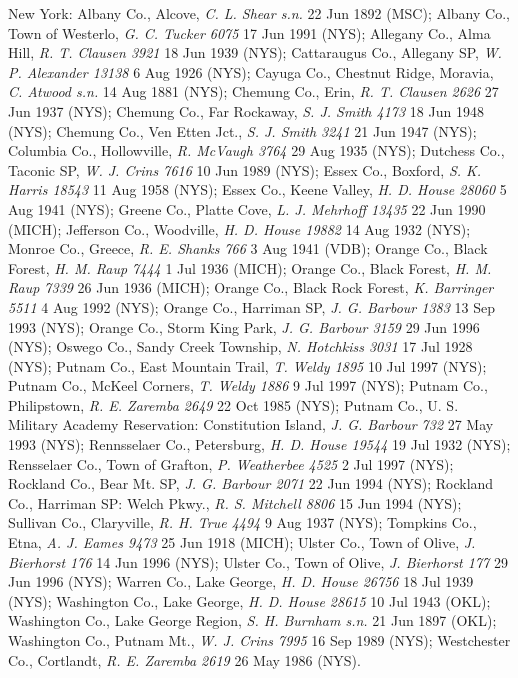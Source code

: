 \documentclass{article}
\begin{document}
New York:
Albany Co., Alcove, \textit{C. L. Shear s.n.} 22 Jun 1892 (MSC);
Albany Co., Town of Westerlo, \textit{G. C. Tucker 6075} 17 Jun 1991 (NYS);
Allegany Co., Alma Hill, \textit{R. T. Clausen 3921} 18 Jun 1939 (NYS);
Cattaraugus Co., Allegany SP, \textit{W. P. Alexander 13138} 6 Aug 1926 (NYS);
Cayuga Co., Chestnut Ridge, Moravia, \textit{C. Atwood s.n.} 14 Aug 1881 (NYS);
Chemung Co., Erin, \textit{R. T. Clausen 2626} 27 Jun 1937 (NYS);
Chemung Co., Far Rockaway, \textit{S. J. Smith 4173} 18 Jun 1948 (NYS);
Chemung Co., Ven Etten Jct., \textit{S. J. Smith 3241} 21 Jun 1947 (NYS);
Columbia Co., Hollowville, \textit{R. McVaugh 3764} 29 Aug 1935 (NYS);
Dutchess Co., Taconic SP, \textit{W. J. Crins 7616} 10 Jun 1989 (NYS);
Essex Co., Boxford, \textit{S. K. Harris 18543} 11 Aug 1958 (NYS);
Essex Co., Keene Valley, \textit{H. D. House 28060} 5 Aug 1941 (NYS);
Greene Co., Platte Cove, \textit{L. J. Mehrhoff 13435} 22 Jun 1990 (MICH);
Jefferson Co., Woodville, \textit{H. D. House 19882} 14 Aug 1932 (NYS);
Monroe Co., Greece, \textit{R. E. Shanks 766} 3 Aug 1941 (VDB);
Orange Co., Black Forest, \textit{H. M. Raup 7444} 1 Jul 1936 (MICH);
Orange Co., Black Forest, \textit{H. M. Raup 7339} 26 Jun 1936 (MICH);
Orange Co., Black Rock Forest, \textit{K. Barringer 5511} 4 Aug 1992 (NYS);
Orange Co., Harriman SP, \textit{J. G. Barbour 1383} 13 Sep 1993 (NYS);
Orange Co., Storm King Park, \textit{J. G. Barbour 3159} 29 Jun 1996 (NYS);
Oswego Co., Sandy Creek Township, \textit{N. Hotchkiss 3031} 17 Jul 1928 (NYS);
Putnam Co., East Mountain Trail, \textit{T. Weldy 1895} 10 Jul 1997 (NYS);
Putnam Co., McKeel Corners, \textit{T. Weldy 1886} 9 Jul 1997 (NYS);
Putnam Co., Philipstown, \textit{R. E. Zaremba 2649} 22 Oct 1985 (NYS);
Putnam Co., U. S. Military Academy Reservation: Constitution Island, \textit{J. G. Barbour 732} 27 May 1993 (NYS);
Rennsselaer Co., Petersburg, \textit{H. D. House 19544} 19 Jul 1932 (NYS);
Rensselaer Co., Town of Grafton, \textit{P. Weatherbee 4525} 2 Jul 1997 (NYS);
Rockland Co., Bear Mt. SP, \textit{J. G. Barbour 2071} 22 Jun 1994 (NYS);
Rockland Co., Harriman SP: Welch Pkwy., \textit{R. S. Mitchell 8806} 15 Jun 1994 (NYS);
Sullivan Co., Claryville, \textit{R. H. True 4494} 9 Aug 1937 (NYS);
Tompkins Co., Etna, \textit{A. J. Eames 9473} 25 Jun 1918 (MICH);
Ulster Co., Town of Olive, \textit{J. Bierhorst 176} 14 Jun 1996 (NYS);
Ulster Co., Town of Olive, \textit{J. Bierhorst 177} 29 Jun 1996 (NYS);
Warren Co., Lake George, \textit{H. D. House 26756} 18 Jul 1939 (NYS);
Washington Co., Lake George, \textit{H. D. House 28615} 10 Jul 1943 (OKL);
Washington Co., Lake George Region, \textit{S. H. Burnham s.n.} 21 Jun 1897 (OKL);
Washington Co., Putnam Mt., \textit{W. J. Crins 7995} 16 Sep 1989 (NYS);
Westchester Co., Cortlandt, \textit{R. E. Zaremba 2619} 26 May 1986 (NYS).
\end{document}
